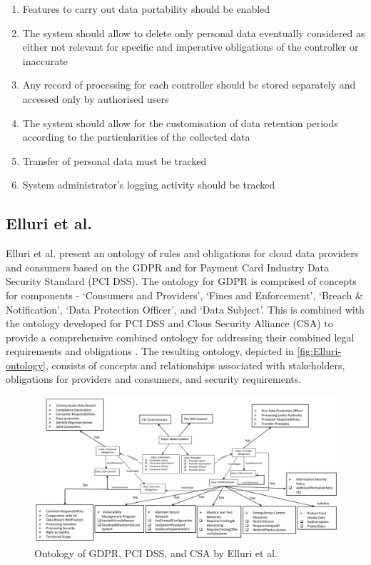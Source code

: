 \begin{enumerate}[label={\textit{Rule\#\theenumi}}]
    \item  Features to carry out data portability should be enabled
    \item  The system should allow to delete only personal data eventually considered as either not relevant
    for specific and imperative obligations of the controller or inaccurate
    \item  Any record of processing for each controller should be stored separately and accessed only by
    authorised users
    \item  The system should allow for the customisation of data retention periods according to the
    particularities of the collected data
    \item  Transfer of personal data must be tracked
    \item  System administrator’s logging activity should be tracked
\end{enumerate}

\subsection{Elluri et al.}
Elluri et al. \cite{elluri_knowledge_2018, elluri_integrated_2018} present an ontology of rules and obligations for cloud data providers and consumers based on the GDPR and for Payment Card Industry Data Security Standard (PCI DSS). The ontology for GDPR \cite{elluri_knowledge_2018} is comprised of concepts for components - `Consumers and Providers', `Fines and Enforcement', `Breach \& Notification', `Data Protection Officer', and `Data Subject'. This is combined with the ontology developed for PCI DSS and Clous Security Alliance (CSA) to provide a comprehensive combined ontology for addressing their combined legal requirements and obligations \cite{elluri_integrated_2018}. The resulting ontology, depicted in \autoref{fig:Elluri-ontology}, consists of concepts and relationships associated with stakeholders, obligations for providers and consumers, and security requirements. 
\begin{figure}[htbp]
    \centering
    \includegraphics[width=\linewidth]{img/Elluri_ontology.png}
    \caption{Ontology of GDPR, PCI DSS, and CSA by Elluri et al. \cite{elluri_integrated_2018}}
    \label{fig:Elluri-ontology}
\end{figure}

